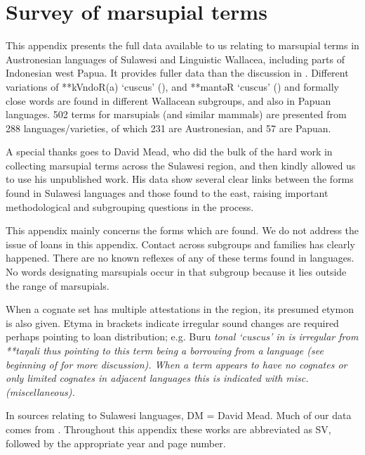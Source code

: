 \chapter{Survey of marsupial terms}\label{ch:SurMar}
This appendix presents the full data available to us relating
to marsupial terms in Austronesian languages of Sulawesi
and Linguistic Wallacea, including parts of Indonesian west Papua.
It provides fuller data than the discussion in .
Different variations of **kVndoR(a) ‘cuscus’ (),
and **mantəR ‘cuscus’ ()
and formally close words are found in different Wallacean subgroups,
and also in Papuan languages.
502 terms for marsupials (and similar mammals)
are presented from 288 languages/varieties,
of which 231 are Austronesian,
and 57 are Papuan.

A special thanks goes to David Mead,
who did the bulk of the hard work in collecting marsupial terms
across the Sulawesi region,
and then kindly allowed us to use his unpublished work.
His data show several clear links between the forms found in
Sulawesi languages and those found to the east,
raising important methodological and subgrouping questions in the process.

This appendix mainly concerns the forms which are found.
We do not address the issue of loans in this appendix.
Contact across subgroups and families has clearly happened.
There are no known reflexes of any of these terms
found in  languages.
No words designating marsupials occur in that subgroup because
it lies outside the range of marsupials.

When a cognate set has multiple attestations in the region,
its presumed etymon is also given.
Etyma in brackets indicate irregular sound changes are required
perhaps pointing to loan distribution; e.g.
Buru \it{tonal} ‘cuscus’ in  is irregular from **taŋali thus
pointing to this term being a borrowing from a 
language (see beginning of  for more discussion).
When a term appears to have no cognates or only limited cognates
in adjacent languages this is indicated with \it{misc.} (miscellaneous).

In sources relating to Sulawesi languages,
DM = David Mead.
Much of our data comes from
\citet{SmitsVoorhoeve1992a,SmitsVoorhoeve1992b,SmitsVoorhoeve1994,SmitsVoorhoeve1998}.
Throughout this appendix these works are abbreviated as SV,
followed by the appropriate year and page number.

